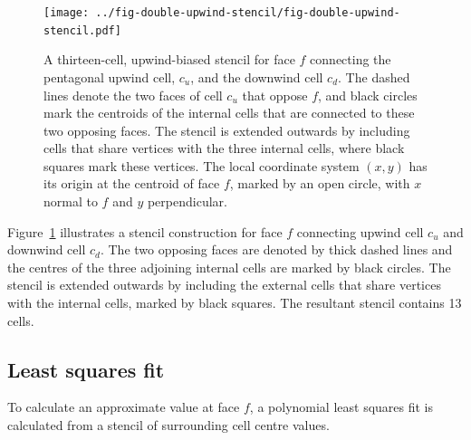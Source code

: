 \begin{figure}
	\centering
	\texttt{[image: ../fig-double-upwind-stencil/fig-double-upwind-stencil.pdf]}
	\caption{A thirteen-cell, upwind-biased stencil for face $f$ connecting the pentagonal upwind cell, $c_u$, and the downwind cell $c_d$.  The dashed lines denote the two faces of cell $c_u$ that oppose $f$, and black circles mark the centroids of the internal cells that are connected to these two opposing faces.  The stencil is extended outwards by including cells that share vertices with the three internal cells, where black squares mark these vertices.  The local coordinate system $(x, y)$ has its origin at the centroid of face $f$, marked by an open circle, with $x$ normal to $f$ and $y$ perpendicular.}
	\label{fig:double-upwind-stencil}
\end{figure}

Figure~\ref{fig:double-upwind-stencil} illustrates a stencil construction for face $f$ connecting upwind cell $c_u$ and downwind cell $c_d$.  The two opposing faces are denoted by thick dashed lines and the centres of the three adjoining internal cells are marked by black circles.  The stencil is extended outwards by including the external cells that share vertices with the internal cells, marked by black squares.  The resultant stencil contains 13 cells.


\subsection{Least squares fit}
To calculate an approximate value at face $f$, a polynomial least squares fit is calculated from a stencil of surrounding cell centre values.


